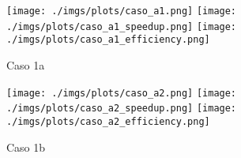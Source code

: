 

\begin{figure}[h]
    \centering
    \texttt{[image: ./imgs/plots/caso\_a1.png]}
    \texttt{[image: ./imgs/plots/caso\_a1\_speedup.png]}
    \texttt{[image: ./imgs/plots/caso\_a1\_efficiency.png]}
    \caption{Caso 1a}
\end{figure}

\begin{figure}[h]
    \centering
    \texttt{[image: ./imgs/plots/caso\_a2.png]}
    \texttt{[image: ./imgs/plots/caso\_a2\_speedup.png]}
    \texttt{[image: ./imgs/plots/caso\_a2\_efficiency.png]}
    \caption{Caso 1b}
\end{figure}

